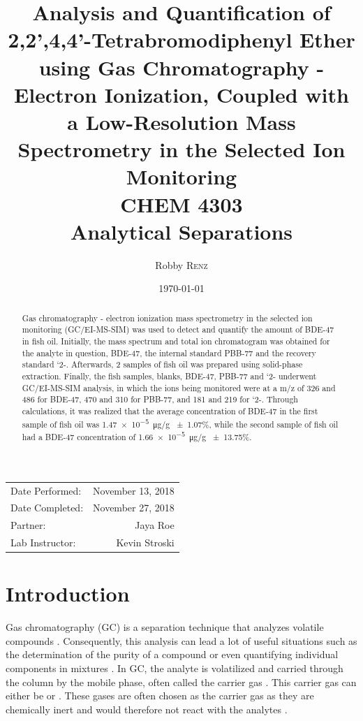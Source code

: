 \documentclass[a4paper, 12pt]{article}
\title{Analysis and Quantification of 2,2',4,4'-Tetrabromodiphenyl Ether using Gas Chromatography - Electron Ionization, Coupled with a Low-Resolution Mass Spectrometry in the Selected Ion Monitoring \\ CHEM 4303 \\ Analytical Separations} %
\author{Robby \textsc{Renz}} %
\date{\today} %
\begin{document}
\maketitle %

\begin{center}
	\begin{tabular}{l r}
		Date Performed: & November 13, 2018 \\ %
		Date Completed: & November 27, 2018 \\
		Partner: & Jaya Roe \\ %
		Lab Instructor: & Kevin Stroski %
	\end{tabular}
\end{center}


\begin{abstract}
	Gas chromatography - electron ionization mass spectrometry in the selected ion monitoring (GC/EI-MS-SIM) was used to detect and quantify the amount of BDE-47 in fish oil. Initially, the mass spectrum and total ion chromatogram was obtained for the analyte in question, BDE-47, the internal standard PBB-77 and the recovery standard `2-. Afterwards, 2 samples of fish oil was prepared using solid-phase extraction. Finally, the fish samples, blanks, BDE-47, PBB-77 and `2- underwent GC/EI-MS-SIM analysis, in which the ions being monitored were at a m/z of 326 and 486 for BDE-47, 470 and 310 for PBB-77, and 181 and 219 for `2-. Through calculations, it was realized that the average concentration of BDE-47 in the first sample of fish oil was  \SI{1.47e-5}{\ug/g} \num{+-1.07}\%, while the second sample of fish oil had a BDE-47 concentration of \SI{1.66e-5}{\ug/g} \num{+-13.75}\%.
\end{abstract}
\newpage


\section{Introduction}
Gas chromatography (GC) is a separation technique that analyzes volatile compounds \cite{vitha_chromatography:_2017}. Consequently, this analysis can lead a lot of useful situations such as the determination of the purity of a compound or even quantifying individual components in mixtures \cite{vitha_chromatography:_2017}. In GC, the analyte is volatilized and carried through the column by the mobile phase, often called the carrier gas \cite{harris}. This carrier gas can either be  or  \cite{harris}. These gases are often chosen as the carrier gas as they are chemically inert and would therefore not react with the analytes \cite{vitha_chromatography:_2017}.
\end{document}
